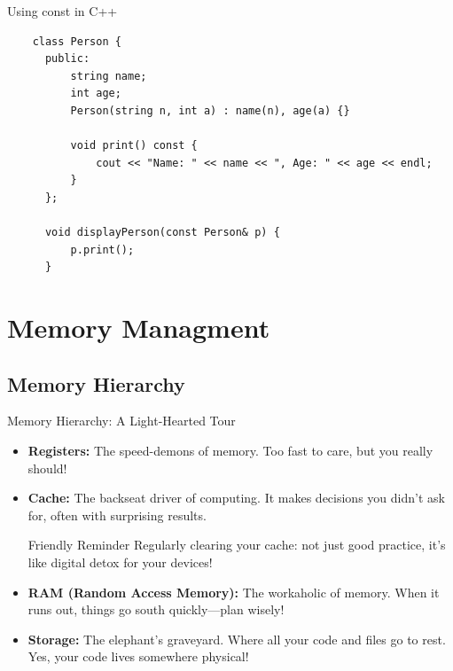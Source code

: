 \documentclass[10pt]{beamer}
\begin{document}
\begin{frame}[fragile]{Using const in C++}
  \begin{lstlisting}
    class Person {
      public:
          string name;
          int age;
          Person(string n, int a) : name(n), age(a) {}
      
          void print() const {
              cout << "Name: " << name << ", Age: " << age << endl;
          }
      };
      
      void displayPerson(const Person& p) {
          p.print();
      }
  \end{lstlisting}
\end{frame}


\section{Memory Managment}

\subsection{Memory Hierarchy}
\begin{frame}{Memory Hierarchy: A Light-Hearted Tour}
  \begin{itemize}
    \item \textbf{Registers:} The speed-demons of memory. Too fast to care, but you really should!
    \item \textbf{Cache:} The backseat driver of computing. It makes decisions you didn't ask for, often with surprising results.
    \begin{alertblock}{Friendly Reminder}
      Regularly clearing your cache: not just good practice, it's like digital detox for your devices!
    \end{alertblock}
    \item \textbf{RAM (Random Access Memory):} The workaholic of memory. When it runs out, things go south quickly—plan wisely!
    \item \textbf{Storage:} The elephant's graveyard. Where all your code and files go to rest. Yes, your code lives somewhere physical!
  \end{itemize}
\end{frame}
\end{document}

